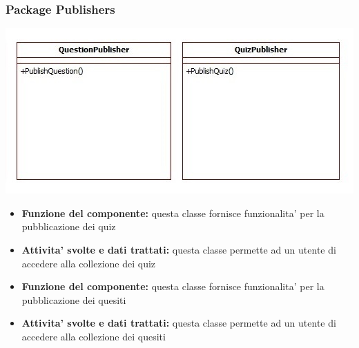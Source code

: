 			\subsubsection{Package Publishers}
			\begin{center}
				\includegraphics[scale=0.9]{../images/Publishers.jpg}
			\end{center}
			\begin{itemize}
				\item\textbf{Funzione del componente:} questa classe fornisce funzionalita' per la pubblicazione dei quiz
				\item\textbf{Attivita' svolte e dati trattati:} questa classe permette ad un utente di accedere alla collezione dei quiz
			\end{itemize}
			\begin{itemize}
				\item\textbf{Funzione del componente:} questa classe fornisce funzionalita' per la pubblicazione dei quesiti
				\item\textbf{Attivita' svolte e dati trattati:} questa classe permette ad un utente di accedere alla collezione dei quesiti
			\end{itemize}
			\newpage